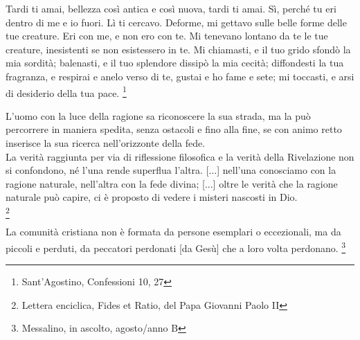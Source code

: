 \begin{vcentered}
    Tardi ti amai, bellezza così antica e così nuova, tardi ti amai. Sì, perché tu eri dentro di me e io fuori. Lì ti cercavo. Deforme, mi gettavo sulle belle forme delle tue creature. Eri con me, e non ero con te. Mi tenevano lontano da te le tue creature, inesistenti se non esistessero in te. Mi chiamasti, e il tuo grido sfondò la mia sordità; balenasti, e il tuo splendore dissipò la mia cecità; diffondesti la tua fragranza, e respirai e anelo verso di te, gustai e ho fame e sete; mi toccasti, e arsi di desiderio della tua pace. \footnote{Sant'Agostino, Confessioni 10, 27}
\end{vcentered}

\begin{vcentered}

    L'uomo con la luce della ragione sa riconoscere la sua strada, ma la può percorrere in maniera spedita, senza ostacoli e fino alla fine, se con animo retto inserisce la sua ricerca nell'orizzonte della fede.\\

    La verità raggiunta per via di riflessione filosofica e la verità della Rivelazione non si confondono, né l'una rende superflua l'altra. [...] nell'una conosciamo con la ragione naturale, nell'altra con la fede divina; [...] oltre le verità che la ragione naturale può capire, ci è proposto di vedere i misteri nascosti in Dio.\\

    \footnote{Lettera enciclica, Fides et Ratio, del Papa Giovanni Paolo II}

\end{vcentered}

\begin{vcentered}
    La comunità cristiana non è formata da persone esemplari o eccezionali, ma da piccoli e perduti, da peccatori perdonati [da Gesù] che a loro volta perdonano. \footnote{Messalino, in ascolto, agosto/anno B}
\end{vcentered}
